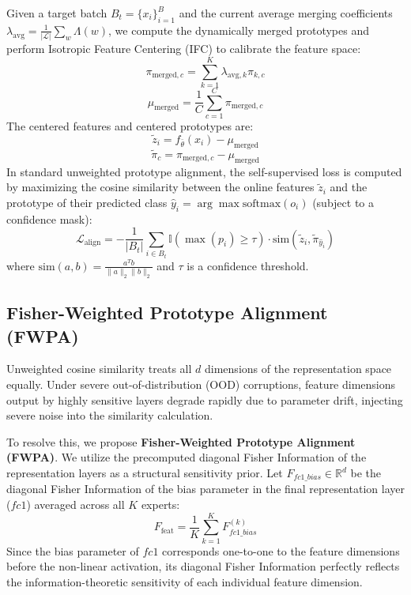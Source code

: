\documentclass{article}
\theoremstyle{plain}
\theoremstyle{definition}
\theoremstyle{remark}
\begin{document}
Given a target batch $B_t = \{x_i\}_{i=1}^B$ and the current average merging coefficients $\lambda_{\text{avg}} = \frac{1}{|\mathcal{L}|} \sum_{w} \Lambda(w)$, we compute the dynamically merged prototypes and perform Isotropic Feature Centering (IFC) \citep{sub8_anon} to calibrate the feature space:
\begin{equation}
    \pi_{\text{merged}, c} = \sum_{k=1}^K \lambda_{\text{avg}, k} \pi_{k, c}
\end{equation}
\begin{equation}
    \mu_{\text{merged}} = \frac{1}{C} \sum_{c=1}^C \pi_{\text{merged}, c}
\end{equation}
The centered features and centered prototypes are:
\begin{equation}
    \tilde{z}_i = f_{\bar{\theta}}(x_i) - \mu_{\text{merged}}
\end{equation}
\begin{equation}
    \tilde{\pi}_{c} = \pi_{\text{merged}, c} - \mu_{\text{merged}}
\end{equation}
In standard unweighted prototype alignment, the self-supervised loss is computed by maximizing the cosine similarity between the online features $\tilde{z}_i$ and the prototype of their predicted class $\hat{y}_i = \arg\max \text{softmax}(o_i)$ (subject to a confidence mask):
\begin{equation}
    \mathcal{L}_{\text{align}} = -\frac{1}{|B_t|} \sum_{i \in B_t} \mathbb{I}(\max(p_i) \ge \tau) \cdot \text{sim}(\tilde{z}_i, \tilde{\pi}_{\hat{y}_i})
\end{equation}
where $\text{sim}(a, b) = \frac{a^T b}{\|a\|_2 \|b\|_2}$ and $\tau$ is a confidence threshold.

\subsection{Fisher-Weighted Prototype Alignment (FWPA)}
Unweighted cosine similarity treats all $d$ dimensions of the representation space equally. Under severe out-of-distribution (OOD) corruptions, feature dimensions output by highly sensitive layers degrade rapidly due to parameter drift, injecting severe noise into the similarity calculation. 

To resolve this, we propose \textbf{Fisher-Weighted Prototype Alignment (FWPA)}. We utilize the precomputed diagonal Fisher Information of the representation layers as a structural sensitivity prior. Let $F_{fc1\_bias} \in \mathbb{R}^d$ be the diagonal Fisher Information of the bias parameter in the final representation layer ($fc1$) averaged across all $K$ experts:
\begin{equation}
    F_{\text{feat}} = \frac{1}{K} \sum_{k=1}^K F^{(k)}_{fc1\_bias}
\end{equation}
Since the bias parameter of $fc1$ corresponds one-to-one to the feature dimensions before the non-linear activation, its diagonal Fisher Information perfectly reflects the information-theoretic sensitivity of each individual feature dimension.
\end{document}
